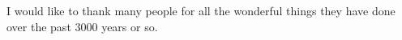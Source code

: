 I would like to thank many people for all the wonderful things they have done over the past 3000 years or so.